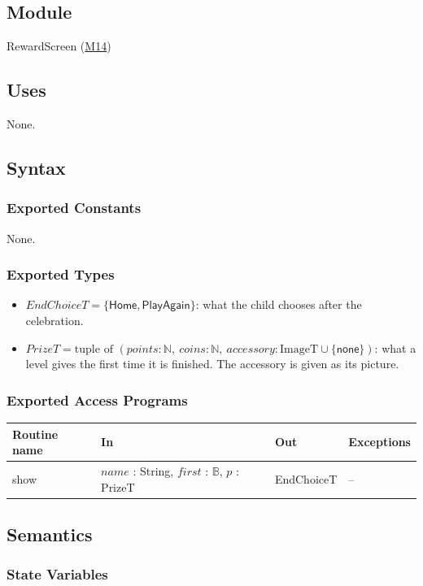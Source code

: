 \documentclass[10pt, titlepage]{article}
\newcommand{\misref}[2]{\hyperref[mis:#1]{M#2}}
\newcommand{\B}{\mathbb{B}}
\newcommand{\N}{\mathbb{N}}
\newcommand{\T}[1]{\mathit{#1}}          %
\newcommand{\V}[1]{\mathsf{#1}}          %
\newenvironment{accessprogs}{%
  \begin{center}\small
  \begin{tabular}{>{\raggedright\arraybackslash}p{3.0cm}
    >{\raggedright\arraybackslash}p{5.0cm}
    >{\raggedright\arraybackslash}p{2.8cm}
    >{\raggedright\arraybackslash}p{3.4cm}}
  \toprule
  \textbf{Routine name} & \textbf{In} & \textbf{Out} & \textbf{Exceptions}\\
  \midrule}{%
  \bottomrule
  \end{tabular}
  \end{center}}
\begin{document}
\subsection{Module}

RewardScreen (\misref{Reward}{14})

\subsection{Uses}

None.

\subsection{Syntax}

\subsubsection{Exported Constants}

None.

\subsubsection{Exported Types}

\begin{itemize}
\item $\T{EndChoiceT} = \{\V{Home}, \V{PlayAgain}\}$: what the child chooses
  after the celebration.
\item $\T{PrizeT} = \text{tuple of } (\T{points} : \N,\ \T{coins} : \N,\ \T{accessory} :
  \text{ImageT} \cup \{\V{none}\})$: what a level gives the first time it is
  finished. The accessory is given as its picture.
\end{itemize}

\subsubsection{Exported Access Programs}

\begin{accessprogs}
show & $\T{name}$ : String, $\T{first}$ : $\B$, $p$ : PrizeT & EndChoiceT & --\\
\end{accessprogs}

\subsection{Semantics}

\subsubsection{State Variables}
\end{document}
